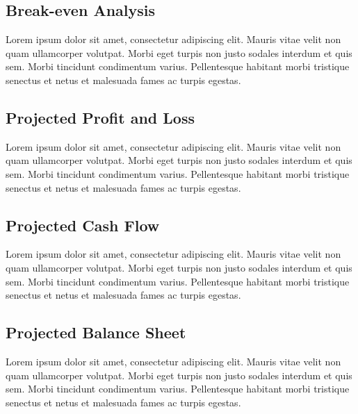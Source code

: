 \documentclass[11pt,a4paper,titlepage]{article}
\begin{document}
\subsection{Break-even Analysis}
Lorem ipsum dolor sit amet, consectetur adipiscing elit. Mauris vitae velit 
non quam ullamcorper volutpat. Morbi eget turpis non justo sodales interdum 
et quis sem. Morbi tincidunt condimentum varius. Pellentesque habitant morbi 
tristique senectus et netus et malesuada fames ac turpis egestas.\newline

\subsection{Projected Profit and Loss}
Lorem ipsum dolor sit amet, consectetur adipiscing elit. Mauris vitae velit 
non quam ullamcorper volutpat. Morbi eget turpis non justo sodales interdum 
et quis sem. Morbi tincidunt condimentum varius. Pellentesque habitant morbi 
tristique senectus et netus et malesuada fames ac turpis egestas.\newline

\subsection{Projected Cash Flow}
Lorem ipsum dolor sit amet, consectetur adipiscing elit. Mauris vitae velit 
non quam ullamcorper volutpat. Morbi eget turpis non justo sodales interdum 
et quis sem. Morbi tincidunt condimentum varius. Pellentesque habitant morbi 
tristique senectus et netus et malesuada fames ac turpis egestas.\newline

\subsection{Projected Balance Sheet}
Lorem ipsum dolor sit amet, consectetur adipiscing elit. Mauris vitae velit 
non quam ullamcorper volutpat. Morbi eget turpis non justo sodales interdum 
et quis sem. Morbi tincidunt condimentum varius. Pellentesque habitant morbi 
tristique senectus et netus et malesuada fames ac turpis egestas.\newline
\end{document}

